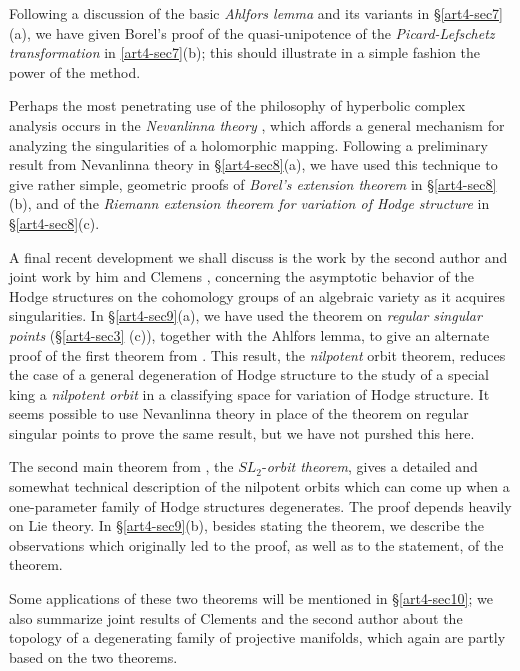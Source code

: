 Following a discussion of the basic \textit{Ahlfors lemma} and its variants in \S \ref{art4-sec7}(a), we have given Borel's proof of the quasi-unipotence of the \textit{Picard-Lefschetz transformation} in \ref{art4-sec7}(b); this should illustrate in a simple fashion the power of the method.

Perhaps the most penetrating use of the philosophy of hyperbolic complex analysis occurs in the \textit{Nevanlinna theory} \cite{art4-key24}, which affords a general mechanism for analyzing the singularities of a holomorphic mapping. Following a preliminary result from Nevanlinna theory in \S \ref{art4-sec8}(a), we have used this technique to give rather simple, geometric proofs of \textit{Borel's extension theorem} \cite{art4-sec5} in \S \ref{art4-sec8}(b), and of the \textit{Riemann extension theorem for variation of Hodge structure} \cite{art4-key19} in \S \ref{art4-sec8}(c).

A final recent development we shall discuss is the work by the second author \cite{art4-key41} and joint work by him and Clemens \cite{art4-key10}, concerning the asymptotic behavior of the Hodge structures on the cohomology groups of an algebraic variety as it acquires singularities. In \S \ref{art4-sec9}(a), we have used the theorem on \textit{regular singular points} (\S \ref{art4-sec3} (c)), together with the Ahlfors lemma, to give an alternate proof of the first theorem from \cite{art4-sec41}. This result, the \textit{nilpotent} orbit theorem, reduces the case of a general degeneration of Hodge structure to the study of a special king a \textit{nilpotent orbit} in a classifying space for variation of Hodge structure. It seems possible to use Nevanlinna theory in place of the theorem on regular singular points to prove the same result, but we have not purshed this here.

The second main theorem from \cite{art4-key41}, the $SL_2$-\textit{orbit theorem}, gives a detailed and somewhat technical description of the nilpotent orbits which can come up when a one-parameter family of Hodge structures degenerates. The proof depends heavily on Lie theory. In \S \ref{art4-sec9}(b), besides stating the theorem, we describe the observations which originally led to the proof, as well as to the statement, of the theorem.

Some applications of these two theorems will be mentioned in \S\ref{art4-sec10}; we also summarize joint results of Clements and the second author about the topology of a degenerating family of projective manifolds, which again are partly based on the two theorems.

